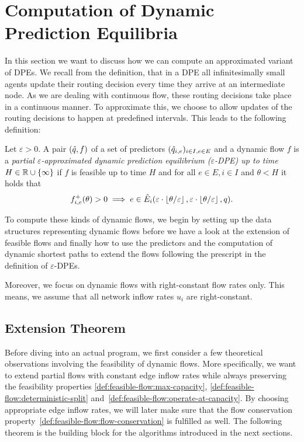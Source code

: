 \section{Computation of Dynamic Prediction Equilibria}

In this section we want to discuss how we can compute an approximated variant of DPEs.
We recall from the definition, that in a DPE all infinitesimally small agents update their routing decision every time they arrive at an intermediate node.
As we are dealing with continuous flow, these routing decisions take place in a continuous manner.
To approximate this, we choose to allow updates of the routing decisions to happen at predefined intervals.
This leads to the following definition:

\begin{definition}
    Let $\varepsilon > 0$.
    A pair $(\hat q, f)$ of a set of predictors $(\hat q_{i,e})_{i\in I, e\in E}$ and a dynamic flow $f$ is a \emph{partial $\varepsilon$-approximated dynamic prediction equilibrium ($\varepsilon$-DPE) up to time $H\in\mathbb{R}\cup\{\infty\}$} if $f$ is feasible up to time $H$ and for all $e\in E, i\in I$ and $\theta < H$ it holds that
    \[
        {f}^+_{i,e}(\theta) > 0 \implies e \in \hat E_i(\varepsilon\cdot \left\lfloor{\theta / \varepsilon}\right\rfloor, \varepsilon\cdot \left\lfloor{\theta / \varepsilon}\right\rfloor, q).
    \]
\end{definition}

To compute these kinds of dynamic flows, we begin by setting up the data structures representing dynamic flows before we have a look at the extension of feasible flows and finally how to use the predictors and the computation of dynamic shortest paths to extend the flows following the prescript in the definition of $\varepsilon$-DPEs.

Moreover, we focus on dynamic flows with right-constant flow rates only.
This means, we assume that all network inflow rates $u_i$ are right-constant.

\subsection{Extension Theorem}

Before diving into an actual program, we first consider a few theoretical observations involving the feasibility of dynamic flows.
More specifically, we want to extend partial flows with constant edge inflow rates while always preserving the feasibility properties \ref{def:feasible-flow:max-capacity}, \ref{def:feasible-flow:deterministic-split} and~\ref{def:feasible-flow:operate-at-capacity}.
By choosing appropriate edge inflow rates, we will later make sure that the flow conservation property~\ref{def:feasible-flow:flow-conservation} is fulfilled as well. 
The following theorem is the building block for the algorithms introduced in the next sections.

